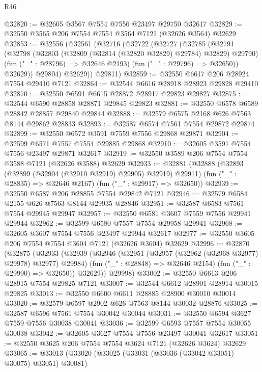 \begin{lexlean}{R46}
\begin{coremodule}
@32820 := @32605 @3567 @7554 @7556 @23497 @29750 @32617
@32829 := @32550 @3565 @206 @7554 @7554 @3564 @7121 (@32626 @3564) @32629
@32853 := @32556
    (@32561
      (@32716
        (@32722
          (@32727
            (@32785
              (@32791
                (@32798
                  (@32803 (@32809 (@32814 (@32820 @32829) @29784) @32829) @29790)
                  (fun ("_" : @28796) => @32646 @2193)
                  (fun ("_" : @29796) => @32650))
                @32629))
            @29804)
          @32629))
      @29811)
@32859 := @32550 @6617 @206 @28924 @7554 @29410 @7121
@32864 := @32544 @6616 @28918 @28923 @29828 @29410
@32870 := @32550 @6591 @6615 @28872 @28917 @29823 @29827
@32875 := @32544 @6590 @28858 @28871 @29845 @29823
@32881 := @32550 @6578 @6589 @28842 @28857 @29840 @29844
@32888 := @32579 @6575 @2168 @626 @7563 @8144 @29862 @28833
@32893 := @32587 @6574 @7561 @7554 @29872 @29874
@32899 := @32550 @6572 @3591 @7559 @7556 @29868 @29871
@32904 := @32599 @6571 @7557 @7554 @29885 @29868
@32910 := @32605 @3591 @7554 @7556 @23497 @29871 @32617
@32919 := @32550 @3589 @206 @7554 @7554 @3588 @7121 (@32626 @3588) @32629
@32933 := @32881
    (@32888
      (@32893 (@32899 (@32904 (@32910 @32919) @29905) @32919) @29911)
      (fun ("_" : @28835) => @32646 @2167)
      (fun ("_" : @29917) => @32650))
@32939 := @32550 @6587 @206 @28855 @7554 @29842 @7121
@32946 := @32579 @6584 @2155 @626 @7563 @8144 @29935 @28846
@32951 := @32587 @6583 @7561 @7554 @29945 @29947
@32957 := @32550 @6581 @3607 @7559 @7556 @29941 @29944
@32962 := @32599 @6580 @7557 @7554 @29958 @29941
@32968 := @32605 @3607 @7554 @7556 @23497 @29944 @32617
@32977 := @32550 @3605 @206 @7554 @7554 @3604 @7121 (@32626 @3604) @32629
@32996 := @32870
    (@32875
      (@32933
        (@32939
          (@32946
            (@32951 (@32957 (@32962 (@32968 @32977) @29978) @32977) @29984)
            (fun ("_" : @28848) => @32646 @2154)
            (fun ("_" : @29990) => @32650))
          @32629))
      @29998)
@33002 := @32550 @6613 @206 @28915 @7554 @29825 @7121
@33007 := @32544 @6612 @28901 @28914 @30015 @29825
@33013 := @32550 @6600 @6611 @28885 @28900 @30010 @30014
@33020 := @32579 @6597 @2902 @626 @7563 @8144 @30032 @28876
@33025 := @32587 @6596 @7561 @7554 @30042 @30044
@33031 := @32550 @6594 @3627 @7559 @7556 @30038 @30041
@33036 := @32599 @6593 @7557 @7554 @30055 @30038
@33042 := @32605 @3627 @7554 @7556 @23497 @30041 @32617
@33051 := @32550 @3625 @206 @7554 @7554 @3624 @7121 (@32626 @3624) @32629
@33065 := @33013
    (@33020
      (@33025 (@33031 (@33036 (@33042 @33051) @30075) @33051) @30081)

\end{coremodule}
\end{lexlean}
